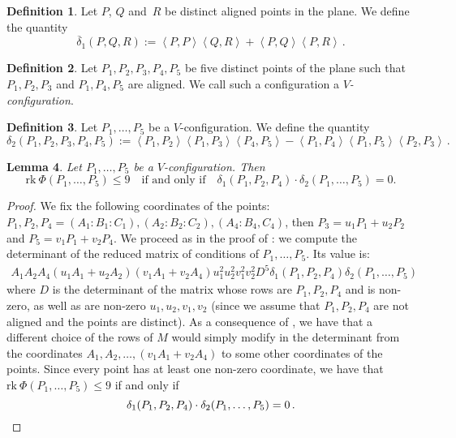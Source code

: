\documentclass[12pt, a4paper, reqno, captions=tableheading,bibliography=totoc]{scrartcl}
\theoremstyle{plain}
\newtheorem{lemma}{Lemma}[section]
\theoremstyle{definition}
\newtheorem{definition}[lemma]{Definition}
\newcommand{\scl}[2]{\left\langle {#1}, {#2} \right\rangle}
\begin{document}
\begin{definition}
\label{definition:delta1b}
 Let $P$, $Q$ and~$R$ be distinct aligned points in the plane.
 We define the quantity
 \[
  \overline{\delta}_1(P, Q, R) :=
  \scl{P}{P} \scl{Q}{R} + \scl{P}{Q}\scl{P}{R} \,.
  \]
\end{definition}

\begin{definition}
\label{Vconf}
Let $P_1, P_2, P_3, P_4, P_5$ be five distinct points of the plane
such that $P_1, P_2, P_3$ and $P_1, P_4, P_5$ are aligned.
We call such a configuration a \emph{$V$-configuration}.
\end{definition}


\begin{definition}
 Let $P_1, \dots, P_5$ be a $V$-configuration.
We define the quantity
 \[
  \delta_2(P_1, P_2, P_3, P_4, P_5) :=
  \scl{P_1}{P_2} \scl{P_1}{P_3} \scl{P_4}{P_5} -
  \scl{P_1}{P_4} \scl{P_1}{P_5} \scl{P_2}{P_3} \,.
 \]
\end{definition}

\begin{lemma}
\label{prop:d1d2}
Let $P_1, \dots, P_5$ be a $V$-configuration. Then
\[
\text{rk}\ \Phi(P_1, \dots, P_5) \leq 9
\quad \mbox{
if and only if} \quad
\delta_1(P_1, P_2, P_4) \cdot \delta_2(P_1, \dots, P_5) = 0.
\]
\end{lemma}
\begin{proof}
We fix the following coordinates of the points:
$P_1, P_2, P_4 = (A_1: B_1: C_1), (A_2: B_2: C_2), (A_4: B_4, C_4)$,
then $P_3 = u_1P_1+u_2P_2$ and $P_5 = v_1P_1+v_2P_4$. We proceed as in
the proof of : we compute the determinant of
the reduced matrix of conditions of $P_1, \dotsc, P_5$.
Its value is:
%
\begin{gather}
\label{delta1delta2}
A_1A_2A_4(u_1A_1+u_2A_2)(v_1A_1+v_2A_4)u_1^2u_2^2v_1^2v_2^2D^5
\delta_1(P_1,P_2,P_4)\delta_2(P_1,\dots,P_5)
\end{gather}
%
where $D$ is the determinant of the matrix whose rows are $P_1, P_2, P_4$
and is non-zero, as well as are non-zero $u_1, u_2, v_1, v_2$ (since we
assume that $P_1, P_2, P_4$ are not aligned and the points are distinct).
As a consequence of , we have that a different
choice of the rows of $M$ would simply modify in the
determinant from  the coordinates
$A_1, A_2, \dots, (v_1A_1+v_2A_4)$ to some other coordinates of the points.
Since every point has at least one non-zero coordinate, we have that
$\text{rk}\ \Phi(P_1, \dots, P_5) \leq 9$ if and only if
\[
\delta_1(P_1, P_2, P_4) \cdot \delta_2(P_1, \dots, P_5) = 0 \,. \qedhere
\]
\end{proof}
\end{document}
